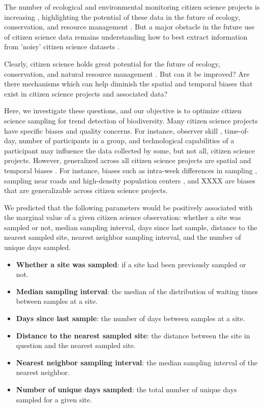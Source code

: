 \documentclass[9pt,twocolumn,twoside,lineno]{pnas-new}
\begin{document}
The number of ecological and environmental monitoring citizen science projects is increasing \cite{pocock2017diversity, theobald2015global}, highlighting the potential of these data in the future of ecology, conservation, and resource management \cite{pocock2018vision, mckinley2017citizen}. But a major obstacle in the future use of citizen science data remains understanding how to best extract information from 'noisy' citizen science datasets \cite{parrish2018exposing}.

Clearly, citizen science holds great potential for the future of ecology, conservation, and natural resource management \cite{pocock2018vision, silvertown2009new, soroye2018opportunistic, mckinley2017citizen}. But can it be improved? Are there mechanisms which can help diminish the spatial and temporal biases that exist in citizen science projects and associated data?

Here, we investigate these questions, and our objective is to optimize citizen science sampling for trend detection of biodiversity. Many citizen science projects have specific biases and quality concerns. For instance, observer skill \cite{kelling2015can}, time-of-day, number of participants in a group, and technological capabilities of a participant may influence the data collected by some, but not all, citizen science projects. However, generalized across all citizen science projects are spatial and temporal biases \cite{boakes2010distorted}. For instance, biases such as intra-week differences in sampling \cite{courter2013weekend}, sampling near roads and high-density population centers \cite{kelling2015taking}, and XXXX are biases that are generalizable across citizen science projects.

We predicted that the following parameters would be positively associated with the marginal value of a given citizen science observation: whether a site was sampled or not, median sampling interval, days since last sample, distance to the nearest sampled site, nearest neighbor sampling interval, and the number of unique days sampled.

\begin{itemize}
  \item \textbf{Whether a site was sampled}: if a site had been previously sampled or not.
  \item \textbf{Median sampling interval}: the median of the distribution of waiting times between samples at a site.
  \item \textbf{Days since last sample}: the number of days between samples at a site.
  \item \textbf{Distance to the nearest sampled site}: the distance between the site in question and the nearest sampled site.
  \item \textbf{Nearest neighbor sampling interval}: the median sampling interval of the nearest neighbor.
  \item \textbf{Number of unique days sampled}: the total number of unique days sampled for a given site.
\end{itemize}
\end{document}
